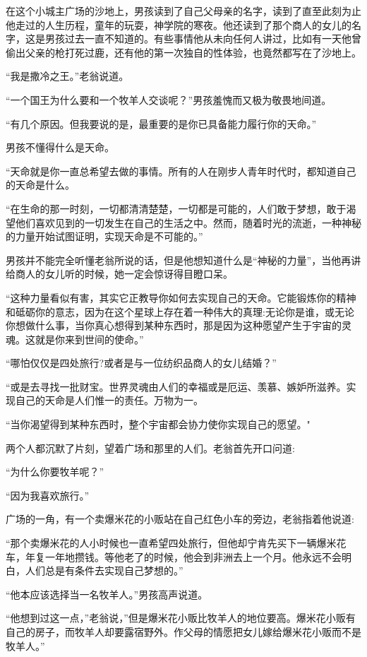 \documentclass[twoside,openany]{book}
\begin{document}
在这个小城主广场的沙地上，男孩读到了自己父母亲的名字，读到了直至此刻为止他走过的人生历程，童年的玩耍，神学院的寒夜。他还读到了那个商人的女儿的名字，这是男孩过去一直不知道的。有些事情他从未向任何人讲过，比如有一天他曾偷出父亲的枪打死过鹿，还有他的第一次独自的性体验，也竟然都写在了沙地上。

“我是撒冷之王。”老翁说道。

“一个国王为什么要和一个牧羊人交谈呢？”男孩羞愧而又极为敬畏地间道。

“有几个原因。但我要说的是，最重要的是你已具备能力履行你的天命。”

男孩不懂得什么是天命。

“天命就是你一直总希望去做的事情。所有的人在刚步人青年时代时，都知道自己的天命是什么。

“在生命的那一时刻，一切都清清楚楚，一切都是可能的，人们敢于梦想，敢于渴望他们喜欢见到的一切发生在自己的生活之中。然而，随着时光的流逝，一种神秘的力量开始试图证明，实现天命是不可能的。”

男孩并不能完全听懂老翁所说的话，但是他想知道什么是“神秘的力量”，当他再讲给商人的女儿听的时候，她一定会惊讶得目瞪口呆。

“这种力量看似有害，其实它正教导你如何去实现自己的天命。它能锻炼你的精神和砥砺你的意志，因为在这个星球上存在着一种伟大的真理:无论你是谁，或无论你想做什么事，当你真心想得到某种东西时，那是因为这种愿望产生于宇宙的灵魂。这就是你来到世间的使命。”

“哪怕仅仅是四处旅行?或者是与一位纺织品商人的女儿结婚？”


“或是去寻找一批财宝。世界灵魂由人们的幸福或是厄运、羡慕、嫉妒所滋养。实现自己的天命是人们惟一的责任。万物为一。

“当你渴望得到某种东西时，整个宇宙都会协力使你实现自己的愿望。"

两个人都沉默了片刻，望着广场和那里的人们。老翁首先开口问道:

“为什么你要牧羊呢？”

“因为我喜欢旅行。”

广场的一角，有一个卖爆米花的小贩站在自己红色小车的旁边，老翁指着他说道:

“那个卖爆米花的人小时候也一直希望四处旅行，但他却宁肯先买下一辆爆米花车，年复一年地攒钱。等他老了的时候，他会到非洲去上一个月。他永远不会明白，人们总是有条件去实现自己梦想的。”

“他本应该选择当一名牧羊人。”男孩高声说道。

“他想到过这一点，”老翁说，”但是爆米花小贩比牧羊人的地位要高。爆米花小贩有自己的房子，而牧羊人却要露宿野外。作父母的情愿把女儿嫁给爆米花小贩而不是牧羊人。”
\end{document}
